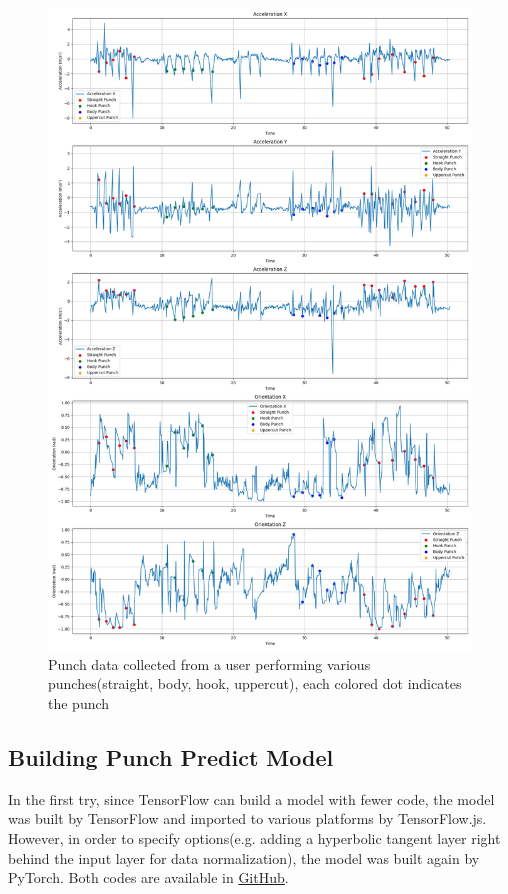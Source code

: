 \documentclass{article}
\begin{document}
\FloatBarrier
\begin{figure}[h]
    \centering
    \includegraphics[width=\textwidth]{punch_data.png}
    \caption{Punch data collected from a user performing various punches(straight, body, hook, uppercut), each colored dot indicates the punch}
    \label{fig:punch_data}
\end{figure}







\FloatBarrier
\subsection{Building Punch Predict Model}

In the first try, since TensorFlow can build a model with fewer code, the model was built by TensorFlow and imported to various platforms by TensorFlow.js. However, in order to specify options(e.g. adding a hyperbolic tangent layer right behind the input layer for data normalization), the model was built again by PyTorch. Both codes are available in \href{https://github.com/punch-boxing/punch-ml/}{GitHub}.
\end{document}
